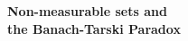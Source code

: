 \documentclass[preview]{standalone}
\begin{document}
\begin{center}
\textbf{Non-measurable sets and \\ the Banach-Tarski Paradox}
\end{center}
\end{document}

